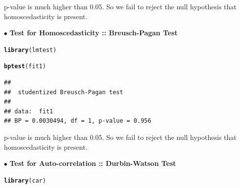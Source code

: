 \documentclass[10pt, a4paper]{article}\usepackage[]{graphicx}\usepackage[]{xcolor}
\makeatletter
\newcommand{\hlstd}[1]{\textcolor[rgb]{0.345,0.345,0.345}{#1}}%
\newcommand{\hlkwd}[1]{\textcolor[rgb]{0.737,0.353,0.396}{\textbf{#1}}}%
\newenvironment{kframe}{%
 \def\at@end@of@kframe{}%
 \ifinner\ifhmode%
  \def\at@end@of@kframe{\end{minipage}}%
  \begin{minipage}{\columnwidth}%
 \fi\fi%
 \def\FrameCommand##1{\hskip\@totalleftmargin \hskip-\fboxsep
 \colorbox{shadecolor}{##1}\hskip-\fboxsep
     \hskip-\linewidth \hskip-\@totalleftmargin \hskip\columnwidth}%
 \MakeFramed {\advance\hsize-\width
   \@totalleftmargin\z@ \linewidth\hsize
   \@setminipage}}%
 {\par\unskip\endMakeFramed%
 \at@end@of@kframe}
\newenvironment{knitrout}{}{} %
\makeatother
\begin{document}
p-value is much higher than 0.05. So we fail to reject the null hypothesis that homoscedasticity is present.


\vspace{50pt}

$\bullet$ \textbf{Test for Homoscedasticity :: Breusch-Pagan Test}

\begin{knitrout}
\color{fgcolor}\begin{kframe}
\begin{alltt}
\hlkwd{library}\hlstd{(lmtest)}
\end{alltt}
\end{kframe}
\end{knitrout}

\begin{knitrout}
\color{fgcolor}\begin{kframe}
\begin{alltt}
\hlkwd{bptest}\hlstd{(fit1)}
\end{alltt}
\begin{verbatim}
## 
## 	studentized Breusch-Pagan test
## 
## data:  fit1
## BP = 0.0030494, df = 1, p-value = 0.956
\end{verbatim}
\end{kframe}
\end{knitrout}

p-value is much higher than 0.05. So we fail to reject the null hypothesis that homoscedasticity is present.

\newpage

$\bullet$ \textbf{Test for Auto-correlation :: Durbin-Watson Test}

\begin{knitrout}
\color{fgcolor}\begin{kframe}
\begin{alltt}
\hlkwd{library}\hlstd{(car)}
\end{alltt}


{\ttfamily\noindent\itshape\color{messagecolor}{\#\# Loading required package: carData}}

{\ttfamily\noindent\itshape\color{messagecolor}{\#\# \\\#\# Attaching package: 'car'}}

{\ttfamily\noindent\itshape\color{messagecolor}{\#\# The following object is masked from 'package:dplyr':\\\#\# \\\#\# \ \ \ \ recode}}

{\ttfamily\noindent\itshape\color{messagecolor}{\#\# The following object is masked from 'package:purrr':\\\#\# \\\#\# \ \ \ \ some}}\end{kframe}
\end{knitrout}
\end{document}
